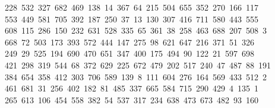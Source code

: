 \begin{tabbing}
\ 228\ 532\ 327\ 682\ 469\ 138\ 14\ 367\ 64\ 215\ 504\ 655\ 352\ 270\ 166\ 117\ \\[0pt]
\ 553\ 449\ 581\ 705\ 392\ 187\ 250\ 37\ 13\ 130\ 307\ 416\ 711\ 580\ 443\ 555\\[0pt]
\>\ 608\ 115\ 286\ 150\ 232\ 631\ 528\ 335\ 65\ 361\ 38\ 258\ 463\ 688\ 207\ 508\ 3\\[0pt]
\ 668\ 72\ 503\ 173\ 393\ 572\ 444\ 147\ 275\ 98\ 621\ 647\ 216\ 371\ 51\ 326\ \\[0pt]
\ 249\ 29\ 525\ 194\ 690\ 470\ 651\ 347\ 400\ 175\ 494\ 90\ 122\ 21\ 597\ 698\\[0pt]
\>\ 421\ 298\ 319\ 544\ 68\ 372\ 629\ 225\ 672\ 479\ 202\ 517\ 240\ 47\ 487\ 88\ 191\\[0pt]
\>\ 384\ 654\ 358\ 412\ 303\ 706\ 589\ 139\ 8\ 111\ 604\ 276\ 164\ 569\ 433\ 512\ 2\\[0pt]
\ 461\ 681\ 31\ 256\ 402\ 182\ 81\ 485\ 337\ 665\ 584\ 715\ 290\ 429\ 4\ 135\ 1\\[0pt]
\ 265\ 613\ 106\ 454\ 558\ 382\ 54\ 537\ 317\ 234\ 638\ 473\ 673\ 482\ 93\ 160\\[0pt]

\end{tabbing}
